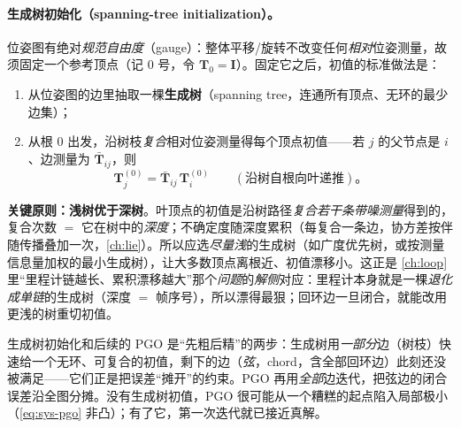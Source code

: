 \paragraph{生成树初始化（spanning-tree initialization）。}
位姿图有绝对\emph{规范自由度}（gauge）：整体平移/旋转不改变任何\emph{相对}位姿测量，故须固定一个参考顶点（记 $0$ 号，令 $\mathbf{T}_0=\mathbf{I}$）。固定它之后，初值的标准做法是：
\begin{enumerate}
  \item 从位姿图的边里抽取一棵\textbf{生成树}（spanning tree，连通所有顶点、无环的最少边集）；
  \item 从根 $0$ 出发，沿树枝\emph{复合}相对位姿测量得每个顶点初值——若 $j$ 的父节点是 $i$、边测量为 $\bar{\mathbf{T}}_{ij}$，则
  \begin{equation}
    \mathbf{T}_j^{(0)}=\bar{\mathbf{T}}_{ij}\,\mathbf{T}_i^{(0)}
    \qquad(\text{沿树自根向叶递推})。
    \label{eq:sys-pgo-spantree}
  \end{equation}
\end{enumerate}
\textbf{关键原则：浅树优于深树}。叶顶点的初值是沿树路径\emph{复合若干条带噪测量}得到的，复合次数 $=$ 它在树中的\emph{深度}；不确定度随深度累积（每复合一条边，协方差按伴随传播叠加一次，\cref{ch:lie}）。所以应选\emph{尽量浅}的生成树（如广度优先树，或按测量信息量加权的最小生成树），让大多数顶点离根近、初值漂移小。这正是 \cref{ch:loop} 里“里程计链越长、累积漂移越大”那个\emph{问题}的\emph{解侧}对应：里程计本身就是一棵\emph{退化成单链}的生成树（深度 $=$ 帧序号），所以漂得最狠；回环边一旦闭合，就能改用更浅的树重切初值。

\begin{insight}
生成树初始化和后续的 PGO 是“先粗后精”的两步：生成树用\emph{一部分}边（树枝）快速给一个无环、可复合的初值，剩下的边（\emph{弦}，chord，含全部回环边）此刻还没被满足——它们正是把误差“摊开”的约束。PGO 再用\emph{全部}边迭代，把弦边的闭合误差沿全图分摊。没有生成树初值，PGO 很可能从一个糟糕的起点陷入局部极小（\cref{eq:sys-pgo} 非凸）；有了它，第一次迭代就已接近真解。
\end{insight}

